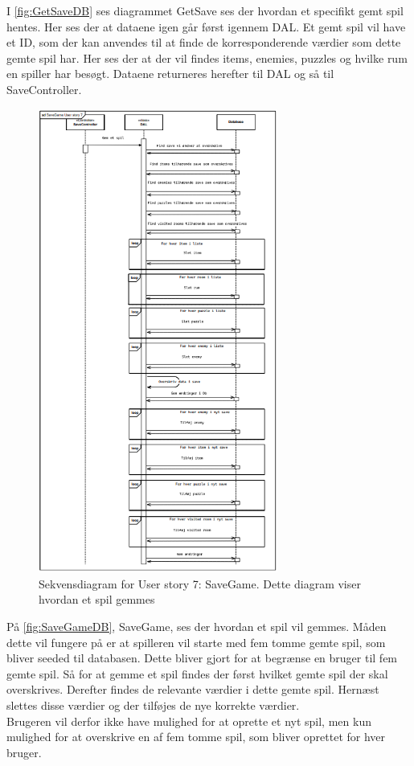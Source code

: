I \autoref{fig:GetSaveDB} ses diagrammet GetSave ses der hvordan et specifikt gemt spil hentes. Her ses der at dataene igen går først igennem DAL. Et gemt spil vil have et ID, som der kan anvendes til at finde de korresponderende værdier som dette gemte spil har. Her ses der at der vil findes items, enemies, puzzles og hvilke rum en spiller har besøgt. Dataene returneres herefter til DAL og så til SaveController.

\begin{figure}[H]
\centering
\includegraphics[width = 0.7\textwidth]{02-Body/Images/SaveGameDB.png}
\caption{Sekvensdiagram for User story 7: SaveGame. Dette diagram viser hvordan et spil gemmes}
\label{fig:SaveGameDB}
\end{figure}

På \autoref{fig:SaveGameDB}, SaveGame, ses der hvordan et spil vil gemmes. Måden dette vil fungere på er at spilleren vil starte med fem tomme gemte spil, som bliver seeded til databasen. Dette bliver gjort for at begrænse en bruger til fem gemte spil. Så for at gemme et spil findes der først hvilket gemte spil der skal overskrives. Derefter findes de relevante værdier i dette gemte spil. Hernæst slettes disse værdier og der tilføjes de nye korrekte værdier.\\
Brugeren vil derfor ikke have mulighed for at oprette et nyt spil, men kun mulighed for at overskrive en af fem tomme spil, som bliver oprettet for hver bruger.



